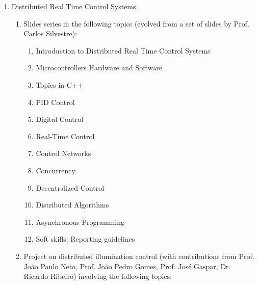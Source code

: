 \documentclass[
]{article}
\begin{document}
\begin{enumerate}
\def\labelenumi{\arabic{enumi}.}
\item
  Distributed Real Time Control Systems

  \begin{enumerate}
  \def\labelenumii{\alph{enumii}.}
  \item
    Slides series in the following topics (evolved from a set of slides
    by Prof. Carlos Silvestre):

    \begin{enumerate}
    \def\labelenumiii{\roman{enumiii}.}
    \item
      Introduction to Distributed Real Time Control Systems
    \item
      Microcontrollers Hardware and Software
    \item
      Topics in C++
    \item
      PID Control
    \item
      Digital Control
    \item
      Real-Time Control
    \item
      Control Networks
    \item
      Concurrency
    \item
      Decentralized Control
    \item
      Distributed Algorithms
    \item
      Asynchronous Programming
    \item
      Soft skills: Reporting guidelines
    \end{enumerate}
  \item
    Project on distributed illumination control (with contributions from
    Prof. João Paulo Neto, Prof. João Pedro Gomes, Prof. José Gaspar,
    Dr. Ricardo Ribeiro) involving the following topics:


\end{enumerate}
\end{enumerate}
\end{document}
